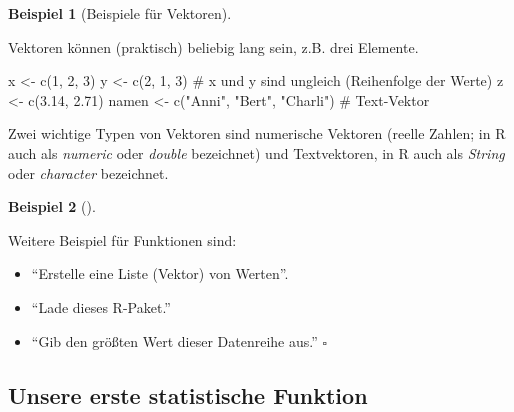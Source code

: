 \documentclass[
  letterpaper,
  oneside,
  open=any]{scrbook}
\newenvironment{Shaded}{\begin{snugshade}}{\end{snugshade}}
\newcommand{\CommentTok}[1]{\textcolor[rgb]{0.37,0.37,0.37}{#1}}
\newcommand{\DecValTok}[1]{\textcolor[rgb]{0.68,0.00,0.00}{#1}}
\newcommand{\FloatTok}[1]{\textcolor[rgb]{0.68,0.00,0.00}{#1}}
\newcommand{\FunctionTok}[1]{\textcolor[rgb]{0.28,0.35,0.67}{#1}}
\newcommand{\NormalTok}[1]{\textcolor[rgb]{0.00,0.23,0.31}{#1}}
\newcommand{\OtherTok}[1]{\textcolor[rgb]{0.00,0.23,0.31}{#1}}
\newcommand{\StringTok}[1]{\textcolor[rgb]{0.13,0.47,0.30}{#1}}
\providecommand{\tightlist}{%
  \setlength{\itemsep}{0pt}\setlength{\parskip}{0pt}}\usepackage{longtable,booktabs,array}
\theoremstyle{definition}
\theoremstyle{definition}
\newtheorem{example}{Beispiel}[chapter]
\theoremstyle{definition}
\theoremstyle{remark}
\begin{document}
\begin{example}[Beispiele für
Vektoren]\protect\hypertarget{exm-vektoren}{}\label{exm-vektoren}

Vektoren können (praktisch) beliebig lang sein, z.B. drei Elemente.

\begin{Shaded}
\begin{Highlighting}[]
\NormalTok{x }\OtherTok{\textless{}{-}} \FunctionTok{c}\NormalTok{(}\DecValTok{1}\NormalTok{, }\DecValTok{2}\NormalTok{, }\DecValTok{3}\NormalTok{)}
\NormalTok{y }\OtherTok{\textless{}{-}} \FunctionTok{c}\NormalTok{(}\DecValTok{2}\NormalTok{, }\DecValTok{1}\NormalTok{, }\DecValTok{3}\NormalTok{)  }\CommentTok{\# x und y sind ungleich (Reihenfolge der Werte)}
\NormalTok{z }\OtherTok{\textless{}{-}} \FunctionTok{c}\NormalTok{(}\FloatTok{3.14}\NormalTok{, }\FloatTok{2.71}\NormalTok{)  }
\NormalTok{namen }\OtherTok{\textless{}{-}} \FunctionTok{c}\NormalTok{(}\StringTok{"Anni"}\NormalTok{, }\StringTok{"Bert"}\NormalTok{, }\StringTok{"Charli"}\NormalTok{) }\CommentTok{\# Text{-}Vektor}
\end{Highlighting}
\end{Shaded}

\end{example}

Zwei wichtige Typen von Vektoren sind numerische Vektoren (reelle
Zahlen; in R auch als \emph{numeric} oder \emph{double} bezeichnet) und
Textvektoren, in R auch als \emph{String} oder \emph{character}
bezeichnet.

\begin{example}[]\protect\hypertarget{exm-funs}{}\label{exm-funs}

Weitere Beispiel für Funktionen sind:

\begin{itemize}
\tightlist
\item
  \enquote{Erstelle eine Liste (Vektor) von Werten}.
\item
  \enquote{Lade dieses R-Paket.}
\item
  \enquote{Gib den größten Wert dieser Datenreihe aus.} \(\square\)
\end{itemize}

\end{example}

\subsection{Unsere erste statistische Funktion}\label{sec-first-fun}
\end{document}
